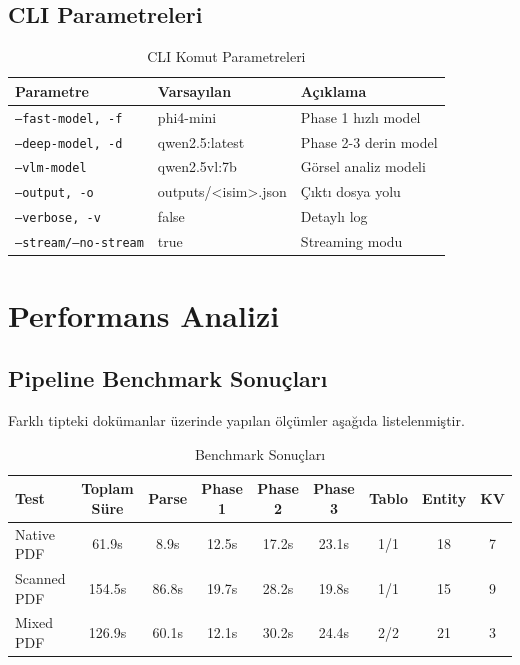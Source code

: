 \documentclass[11pt,a4paper]{article}
\begin{document}
\subsection{CLI Parametreleri}
\begin{table}[H]
\centering
\caption{CLI Komut Parametreleri}
\begin{tabular}{lll}
\toprule
Parametre & Varsayılan & Açıklama \\
\midrule
\texttt{--fast-model, -f} & phi4-mini & Phase 1 hızlı model \\
\texttt{--deep-model, -d} & qwen2.5:latest & Phase 2-3 derin model \\
\texttt{--vlm-model} & qwen2.5vl:7b & Görsel analiz modeli \\
\texttt{--output, -o} & outputs/<isim>.json & Çıktı dosya yolu \\
\texttt{--verbose, -v} & false & Detaylı log \\
\texttt{--stream/--no-stream} & true & Streaming modu \\
\bottomrule
\end{tabular}
\end{table}

\section{Performans Analizi}

\subsection{Pipeline Benchmark Sonuçları}
Farklı tipteki dokümanlar üzerinde yapılan ölçümler aşağıda listelenmiştir.

\begin{table}[H]
\centering
\caption{Benchmark Sonuçları}
\begin{tabular}{lcccccccc}
\toprule
Test & Toplam Süre & Parse & Phase 1 & Phase 2 & Phase 3 & Tablo & Entity & KV \\
\midrule
Native PDF & 61.9s & 8.9s & 12.5s & 17.2s & 23.1s & 1/1 & 18 & 7 \\
Scanned PDF & 154.5s & 86.8s & 19.7s & 28.2s & 19.8s & 1/1 & 15 & 9 \\
Mixed PDF & 126.9s & 60.1s & 12.1s & 30.2s & 24.4s & 2/2 & 21 & 3 \\
\bottomrule
\end{tabular}
\end{table}
\end{document}
